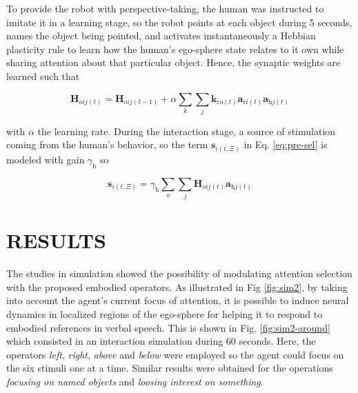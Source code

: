\documentclass[letterpaper, 10 pt, conference]{ieeeconf}  %
\begin{document}
	To provide the robot with perspective-taking, the human was instructed to imitate it in a learning stage, so the robot points at each object during 5 seconds, names the object being pointed, and activates instantaneously a Hebbian plasticity rule to learn how the human's ego-sphere state relates to it own while sharing attention about that particular object. Hence, the synaptic weights are learned such that
	
	\begin{equation}
	\mathbf{H}_{oij(t)} = \mathbf{H}_{oij(t-1)} + \alpha \sum_{k}\sum_{j}\mathbf{k}_{\mathrm{r}o(t)}\mathbf{a}_{\mathrm{r}i(t)}\mathbf{a}_{\mathrm{h}j(t)}
	\label{eq:hebb_rule}
	\end{equation}	
	
	\noindent with $\alpha$ the learning rate. During the interaction stage, a source of stimulation coming from the human's behavior, so the term $\mathbf{s}_{i(t,\Xi)}$ in Eq. \eqref{eq:pre-sel} is modeled with gain $\gamma_{\mathrm{h}}$ so
	
	\begin{equation}
	\mathbf{s}_{i(t,\Xi)} = \gamma_{\mathrm{h}}\sum_{o}\sum_{j}\mathbf{H}_{oij(t)}\mathbf{a}_{\mathrm{h}j(t)}
	\label{eq:hebb_stim}
	\end{equation}	
	
%		
	\section{RESULTS}
	\label{sec:results}
	
	The studies in simulation showed the possibility of modulating attention selection with the proposed embodied operators. As illustrated in Fig \ref{fig:sim2}, by taking into account the agent's current focus of attention, it is possible to induce neural dynamics in localized regions of the ego-sphere for helping it to respond to embodied references in verbal speech. This is shown in Fig. \ref{fig:sim2-around} which consisted in an interaction simulation during 60 seconds. Here, the operators \textit{left}, \textit{right}, \textit{above} and \textit{below} were employed so the agent could focus on the six stimuli one at a time. Similar results were obtained for the operations \textit{focusing on named objects} and \textit{loosing interest on something}.
\end{document}
